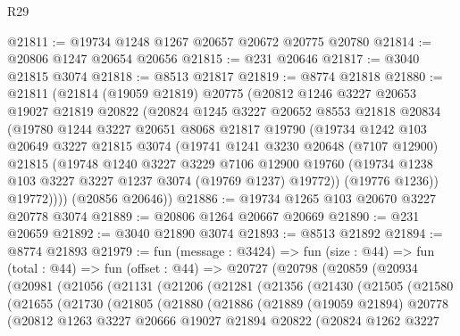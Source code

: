 \begin{lexlean}{R29}
\begin{coremodule}
@21811 := @19734 @1248 @1267 @20657 @20672 @20775 @20780
@21814 := @20806 @1247 @20654 @20656
@21815 := @231 @20646
@21817 := @3040 @21815 @3074
@21818 := @8513 @21817
@21819 := @8774 @21818
@21880 := @21811
    (@21814
      (@19059 @21819)
      @20775
      (@20812
        @1246
        @3227
        @20653
        @19027
        @21819
        @20822
        (@20824
          @1245
          @3227
          @20652
          @8553
          @21818
          @20834
          (@19780
            @1244
            @3227
            @20651
            @8068
            @21817
            @19790
            (@19734
              @1242
              @103
              @20649
              @3227
              @21815
              @3074
              (@19741
                @1241
                @3230
                @20648
                (@7107 @12900)
                @21815
                (@19748
                  @1240
                  @3227
                  @3229
                  @7106
                  @12900
                  @19760
                  (@19734 @1238 @103 @3227 @3227 @1237 @3074 (@19769 @1237) @19772))
                (@19776 @1236))
              @19772))))
      (@20856 @20646))
@21886 := @19734 @1265 @103 @20670 @3227 @20778 @3074
@21889 := @20806 @1264 @20667 @20669
@21890 := @231 @20659
@21892 := @3040 @21890 @3074
@21893 := @8513 @21892
@21894 := @8774 @21893
@21979 := fun (message : @3424) =>
  fun (size : @44) =>
  fun (total : @44) =>
  fun (offset : @44) =>
  @20727
    (@20798
      (@20859
        (@20934
          (@20981
            (@21056
              (@21131
                (@21206
                  (@21281
                    (@21356
                      (@21430
                        (@21505
                          (@21580
                            (@21655
                              (@21730
                                (@21805
                                  (@21880
                                    (@21886
                                      (@21889
                                        (@19059 @21894)
                                        @20778
                                        (@20812
                                          @1263
                                          @3227
                                          @20666
                                          @19027
                                          @21894
                                          @20822
                                          (@20824
                                            @1262
                                            @3227

\end{coremodule}
\end{lexlean}
